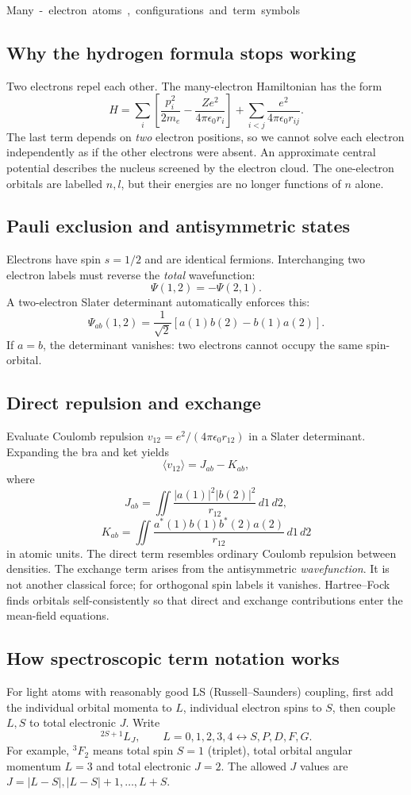 \unit{Many-electron atoms, configurations and term symbols}
\subsection{Why the hydrogen formula stops working}
Two electrons repel each other. The
many-electron Hamiltonian has the form
\[
\boxed{H=\sum_i\left[\frac{p_i^2}{2m_e}
-\frac{Ze^2}{4\pi\epsilon_0r_i}\right]
+\sum_{i<j}\frac{e^2}{4\pi\epsilon_0r_{ij}}.}
\]
The last term depends on \emph{two}
electron positions, so we cannot solve
each electron independently as if the
other electrons were absent.
An approximate central potential describes
the nucleus screened by the electron cloud.
The one-electron orbitals are labelled
\(n,l\), but their energies are no longer
functions of \(n\) alone.

\subsection{Pauli exclusion and antisymmetric states}
Electrons have spin \(s=1/2\) and
are identical fermions. Interchanging
two electron labels must reverse
the \emph{total} wavefunction:
\[
\Psi(1,2)=-\Psi(2,1).
\]
A two-electron Slater determinant
automatically enforces this:
\[
\Psi_{ab}(1,2)=\frac1{\sqrt2}
[a(1)b(2)-b(1)a(2)].
\]
If \(a=b\), the determinant vanishes:
two electrons cannot occupy the
same spin-orbital.

\subsection{Direct repulsion and exchange}
Evaluate Coulomb repulsion
\(v_{12}=e^2/(4\pi\epsilon_0r_{12})\)
in a Slater determinant. Expanding
the bra and ket yields
\[
\boxed{\langle v_{12}\rangle=J_{ab}-K_{ab}},
\]
where
\[
J_{ab}=\iint\frac{|a(1)|^2|b(2)|^2}{r_{12}}\,
d1\,d2,
\]
\[
K_{ab}=\iint\frac{a^*(1)b(1)b^*(2)a(2)}
{r_{12}}\,d1\,d2
\]
in atomic units. The direct term resembles
ordinary Coulomb repulsion between densities.
The exchange term arises from the
antisymmetric \emph{wavefunction}.
It is not another classical force;
for orthogonal spin labels it vanishes.
Hartree--Fock finds orbitals self-consistently
so that direct and exchange contributions
enter the mean-field equations.

\subsection{How spectroscopic term notation works}
For light atoms with reasonably good
LS (Russell--Saunders) coupling, first
add the individual orbital momenta to
\(L\), individual electron spins to
\(S\), then couple \(L,S\) to total
electronic \(J\). Write
\[
\boxed{{}^{2S+1}L_J},\qquad
L=0,1,2,3,4\leftrightarrow S,P,D,F,G.
\]
For example, \({}^3F_2\) means
total spin \(S=1\) (triplet),
total orbital angular momentum \(L=3\)
and total electronic \(J=2\).
The allowed \(J\) values are
\(J=|L-S|,|L-S|+1,\ldots,L+S\).

